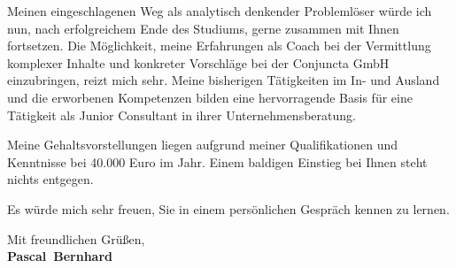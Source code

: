\documentclass[11pt,a4paper]{article}
\def\firstname{Pascal}
\def\familyname{Bernhard}
\begin{document}
Meinen eingeschlagenen Weg als analytisch denkender Problemlöser würde ich nun, nach erfolgreichem Ende des Studiums, gerne zusammen mit Ihnen fortsetzen.
Die Möglichkeit, meine Erfahrungen als Coach bei der Vermittlung komplexer Inhalte und konkreter Vorschläge bei der Conjuncta GmbH einzubringen, reizt mich sehr. Meine bisherigen Tätigkeiten im In- und Ausland und die erworbenen Kompetenzen bilden eine hervorragende Basis für eine Tätigkeit als Junior Consultant in ihrer Unternehmensberatung.


Meine Gehaltsvorstellungen liegen aufgrund meiner Qualifikationen und Kenntnisse bei 40.000 Euro im Jahr. Einem baldigen Einstieg bei Ihnen steht nichts entgegen.


Es würde mich sehr freuen, Sie in einem persönlichen Gespräch kennen zu lernen.

  
Mit freundlichen Grüßen,\\[3em] %
%
{\bfseries \firstname~\familyname}\\
%
\end{document}
